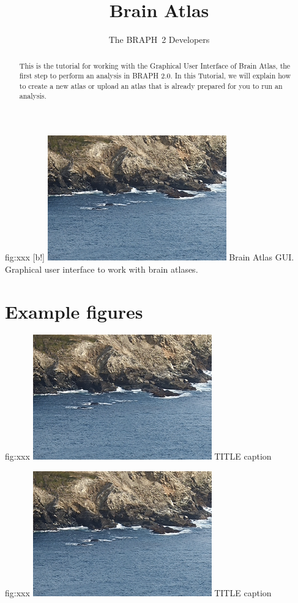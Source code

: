 \documentclass{tufte-handout}
\title{Brain Atlas}
\author[The BRAPH~2 Developers]{The BRAPH~2 Developers}
\begin{document}
\maketitle

	{fig:xxx}
	{
	[b!]
	\includegraphics{tut_ba/fig1.png}
	}
	{Brain Atlas GUI.}
	{
	Graphical user interface to work with brain atlases. 
	}
	
\begin{abstract}
\noindent
This is the tutorial for working with the Graphical User Interface of Brain Atlas, the first step to perform an analysis in BRAPH 2.0. 
In this Tutorial, we will explain how to create a new atlas or upload an atlas that is already prepared for you to run an analysis.
\end{abstract}

\clearpage
\section{Example figures}

	{fig:xxx}
	{\includegraphics{tut_ba/fig1.png}}
	{TITLE}
	{
	caption
	}

	{fig:xxx}
	{\includegraphics{tut_ba/fig1.png}}
	{TITLE}
	{
	caption
	}
\end{document}
